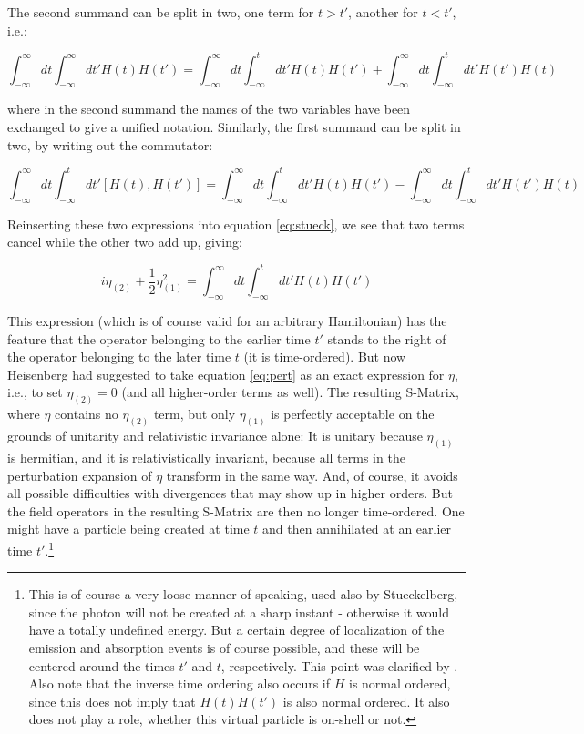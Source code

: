 \documentclass[12pt,a4paper]{article}
\begin{document}
The second summand can be split in two, one term for $t>t'$, another for $t<t'$, i.e.:

\begin{equation}
\int_{-\infty}^{\infty} dt \int_{-\infty}^{\infty} dt' H(t)  H(t') = \int_{-\infty}^{\infty} dt \int_{-\infty}^{t} dt' H(t)  H(t') + \int_{-\infty}^{\infty} dt \int_{-\infty}^{t} dt' H(t')  H(t)
\end{equation}

where in the second summand the names of the two variables have been exchanged to give a unified notation. Similarly, the first summand can be split in two, by writing out the commutator:

\begin{equation}
\int_{-\infty}^{\infty} dt \int_{-\infty}^{t} dt' \left[H(t), H(t') \right] = \int_{-\infty}^{\infty} dt \int_{-\infty}^{t} dt' H(t)  H(t') - \int_{-\infty}^{\infty} dt \int_{-\infty}^{t} dt' H(t')  H(t)
\end{equation}

Reinserting these two expressions into equation \ref{eq:stueck}, we see that two terms cancel while the other two add up, giving:

\begin{equation}
\label{eq:pertend}
i \eta_{(2)} + \frac{1}{2} \eta_{(1)}^2 =  \int_{-\infty}^{\infty} dt \int_{-\infty}^{t} dt' H(t)  H(t')
\end{equation}

This expression (which is of course valid for an arbitrary Hamiltonian) has the feature that the operator belonging to the earlier time $t'$ stands to the right of the operator belonging to the later time $t$ (it is time-ordered). But now Heisenberg had suggested to take equation \ref{eq:pert} as an exact expression for $\eta$, i.e., to set $\eta_{(2)} = 0$ (and all higher-order terms as well). The resulting S-Matrix, where $\eta$ contains no $\eta_{(2)}$ term, but only $\eta_{(1)}$ is perfectly acceptable on the grounds of unitarity and relativistic invariance alone: It is unitary because $\eta_{(1)}$ is hermitian, and it is relativistically invariant, because all terms in the perturbation expansion of $\eta$ transform in the same way. And, of course, it avoids all possible difficulties with divergences that may show up in higher orders. But the field operators in the resulting S-Matrix are then no longer time-ordered. One might have a particle being created at time $t$ and then annihilated at an earlier time $t'$.\footnote{This is of course a very loose manner of speaking, used also by Stueckelberg, since the photon will not be created at a sharp instant - otherwise it would have a totally undefined energy. But a certain degree of localization of the emission and absorption events is of course possible, and these will be centered around the times $t'$ and $t$, respectively. This point was clarified by \citet{fierz_1950_uber-die-bedeutung}. Also note that the inverse time ordering also occurs if $H$ is normal ordered, since this does not imply that $H(t) H(t')$ is also normal ordered. It also does not play a role, whether this virtual particle is on-shell or not.}
\end{document}
